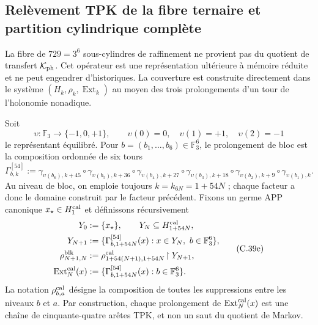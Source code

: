 \subsection{Relèvement TPK de la fibre ternaire et partition cylindrique complète}
\label{subsec:elevacion-catalogal-ch}

La fibre de \(729=3^6\) sous-cylindres de raffinement ne provient pas du quotient de transfert \(\mathcal K_{\rm ph}\). Cet opérateur est une représentation ultérieure à mémoire réduite et ne peut engendrer d'historiques. La couverture est construite directement dans le système \((H_k,\rho_k,\operatorname{Ext}_k)\) au moyen des trois prolongements d'un tour de l'holonomie nonadique.





Soit
\[
 \upsilon:\mathbb F_3\longrightarrow\{-1,0,+1\},\qquad
 \upsilon(0)=0,\quad\upsilon(1)=+1,\quad\upsilon(2)=-1
\]
le représentant équilibré. Pour \(b=(b_1,\ldots,b_6)\in\mathbb F_3^6\), le prolongement de bloc est la composition ordonnée de six tours
\[
 \Gamma_{b,k}^{[54]}:=
 \gamma_{\upsilon(b_6),k+45}\circ\gamma_{\upsilon(b_5),k+36}\circ
 \gamma_{\upsilon(b_4),k+27}\circ\gamma_{\upsilon(b_3),k+18}\circ
 \gamma_{\upsilon(b_2),k+9}\circ\gamma_{\upsilon(b_1),k}.
\tag{C.39d}
\label{eq:gamma-bloque-54-ch}
\]
Au niveau de bloc, on emploie toujours \(k=k_{6N}=1+54N\) ; chaque facteur a donc le domaine construit par le facteur précédent. Fixons un germe APP canonique \(x_\star\in H^{\rm cal}_1\) et définissons récursivement
\[
 \begin{aligned}
  Y_0&:=\{x_\star\},\qquad Y_N\subseteq H_{1+54N}^{\rm cal},\\
  Y_{N+1}&:=\{\Gamma_{b,1+54N}^{[54]}(x):
                 x\in Y_N,\ b\in\mathbb F_3^6\},\\
  \rho^{\rm blk}_{N+1,N}
    &:=\rho^{\rm cal}_{1+54(N+1),1+54N}
       \!\upharpoonright Y_{N+1},\\
  \operatorname{Ext}^{\rm cal}_N(x)
    &:=\{\Gamma_{b,1+54N}^{[54]}(x):b\in\mathbb F_3^6\}.
 \end{aligned}
\tag{C.39e}
\label{eq:sincronizacion-54-ch}
\]
La notation \(\rho^{\rm cal}_{b,a}\) désigne la composition de toutes les suppressions
entre les niveaux \(b\) et \(a\). Par construction, chaque prolongement de
\(\operatorname{Ext}^{\rm cal}_N(x)\) est une chaîne de cinquante-quatre
arêtes TPK, et non un saut du quotient de Markov.

